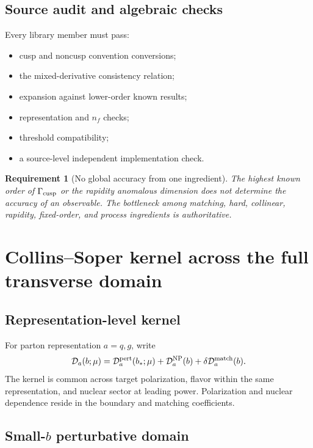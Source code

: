 \documentclass[11pt]{article}
\newtheorem{requirement}[definition]{Requirement}
\begin{document}
\subsection{Source audit and algebraic checks}

Every library member must pass:
\begin{itemize}
\item cusp and noncusp convention conversions;
\item the mixed-derivative consistency relation;
\item expansion against lower-order known results;
\item representation and \(n_f\) checks;
\item threshold compatibility;
\item a source-level independent implementation check.
\end{itemize}

\begin{requirement}[No global accuracy from one ingredient]
The highest known order of \(\Gamma_{\rm cusp}\) or the rapidity anomalous dimension does not determine the accuracy of an observable.  The bottleneck among matching, hard, collinear, rapidity, fixed-order, and process ingredients is authoritative.
\end{requirement}

\section{Collins--Soper kernel across the full transverse domain}
\label{sec:cs-kernel}

\subsection{Representation-level kernel}

For parton representation \(a=q,g\), write
\begin{equation}
 \mathcal D_a(b;\mu)
 =
 \mathcal D_a^{\rm pert}(b_\ast;\mu)
 +
 \mathcal D_a^{\rm NP}(b)
 +
 \delta\mathcal D_a^{\rm match}(b).
 \label{eq:cs-decomposition}
\end{equation}
The kernel is common across target polarization, flavor within the same representation, and nuclear sector at leading power.  Polarization and nuclear dependence reside in the boundary and matching coefficients.

\subsection{Small-\texorpdfstring{\(b\)}{b} perturbative domain}
\end{document}

